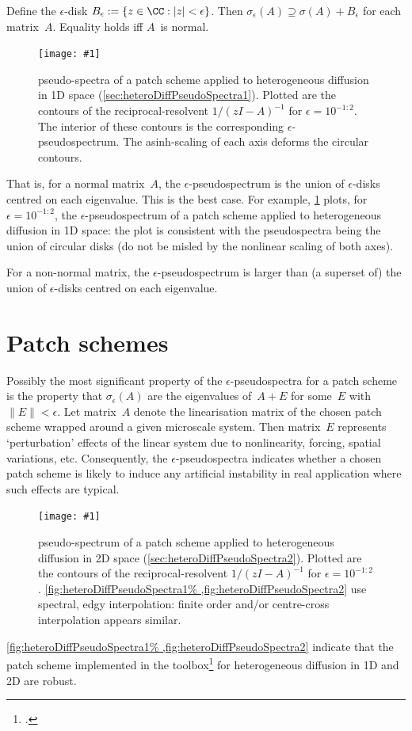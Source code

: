 \documentclass[11pt,a5paper]{article}
\newcommand\PSfig[2]{\begin{figure}\centering
    \caption{\label{fig:#1}#2}
    \texttt{[image: \#1]}
    \end{figure}}
\begin{document}
\begin{theorem}
Define the \(\epsilon\)-disk \(B_\epsilon:=\{z\in\CC: |z|<\epsilon\}\).
Then \(\sigma_\epsilon(A)\supseteq \sigma(A)+B_\epsilon\) for each matrix~\(A\).  Equality holds iff \(A\)~is normal.
\end{theorem}
\PSfig{heteroDiffPseudoSpectra1}{pseudo-spectra of a patch scheme applied to heterogeneous diffusion in 1D space (\cref{sec:heteroDiffPseudoSpectra1}).  
Plotted are the contours of the reciprocal-resolvent \(1\big/(zI-A)^{-1}\) for \(\epsilon=10^{-1:2}\).  The interior of these contours is the corresponding \(\epsilon\)-pseudospectrum.  The asinh-scaling of each axis deforms the circular contours.}%
That is, for a normal matrix~\(A\), the \(\epsilon\)-pseudospectrum is the union of \(\epsilon\)-disks centred on each eigenvalue.
This is the best case.
For example, \cref{fig:heteroDiffPseudoSpectra1} plots, for \(\epsilon=10^{-1:2}\), the \(\epsilon\)-pseudospectrum of a patch scheme applied to heterogeneous diffusion in 1D space: the plot is consistent with the pseudospectra being the union of circular disks (do not be misled by the nonlinear scaling of both axes).


For a non-normal matrix, the \(\epsilon\)-pseudospectrum is larger than (a superset of) the union of \(\epsilon\)-disks centred on each eigenvalue.


\section{Patch schemes}

Possibly the most significant property of the \(\epsilon\)-pseudospectra for a patch scheme is the property that \(\sigma_\epsilon(A)\) are the eigenvalues of~\(A+E\) for some~\(E\) with \(\|E\|<\epsilon\).
Let matrix~\(A\) denote the linearisation matrix of the chosen patch scheme wrapped around a given microscale system.
Then matrix~\(E\) represents `perturbation' effects of the linear system due to nonlinearity, forcing, spatial variations, etc. 
Consequently, the \(\epsilon\)-pseudospectra indicates whether a chosen patch scheme is likely to induce any artificial instability in real application where such effects are typical. 



\PSfig{heteroDiffPseudoSpectra2}{pseudo-spectrum of a patch scheme applied to heterogeneous diffusion in 2D space (\cref{sec:heteroDiffPseudoSpectra2}).
Plotted are the contours of the reciprocal-resolvent \(1\big/(zI-A)^{-1}\) for \(\epsilon=10^{-1:2}\).
\cref{fig:heteroDiffPseudoSpectra1%
,fig:heteroDiffPseudoSpectra2} use spectral, edgy interpolation: finite order and/or centre-cross interpolation appears similar. }
\cref{fig:heteroDiffPseudoSpectra1%
,fig:heteroDiffPseudoSpectra2} indicate that the patch scheme implemented in the toolbox\footcite{Maclean2020a, Roberts2019b} for heterogeneous diffusion in 1D and 2D are robust.
\end{document}
